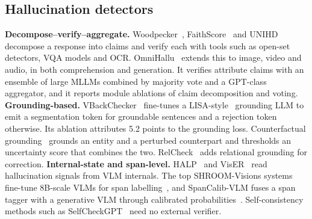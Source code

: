 \documentclass[11pt]{article}
\begin{document}
\subsection{Hallucination detectors}
\textbf{Decompose--verify--aggregate.} Woodpecker~\cite{yin2023woodpecker}, FaithScore~\cite{jing2024faithscore} and UNIHD~\cite{chen2024unihd} decompose a response into claims and verify each with tools such as open-set detectors, VQA models and OCR. OmniHallu~\cite{yang2026omnihallu} extends this to image, video and audio, in both comprehension and generation. It verifies attribute claims with an ensemble of large MLLMs combined by majority vote and a GPT-class aggregator, and it reports module ablations of claim decomposition and voting. \textbf{Grounding-based.} VBackChecker~\cite{guo2026vbackchecker} fine-tunes a LISA-style~\cite{lai2024lisa} grounding LLM to emit a segmentation token for groundable sentences and a rejection token otherwise. Its ablation attributes 5.2 points to the grounding loss. Counterfactual grounding~\cite{song2026countervhd} grounds an entity and a perturbed counterpart and thresholds an uncertainty score that combines the two. RelCheck~\cite{patil2026relcheck} adds relational grounding for correction. \textbf{Internal-state and span-level.} HALP~\cite{kogilathota2026halp} and VisER~\cite{hasanebrahimi2026viser} read hallucination signals from VLM internals. The top SHROOM-Visions systems fine-tune 8B-scale VLMs for span labelling~\cite{vazquez2026shroomvisions}, and SpanCalib-VLM fuses a span tagger with a generative VLM through calibrated probabilities~\cite{abebe2026spancalib}. Self-consistency methods such as SelfCheckGPT~\cite{manakul2023selfcheckgpt} need no external verifier.
\end{document}
